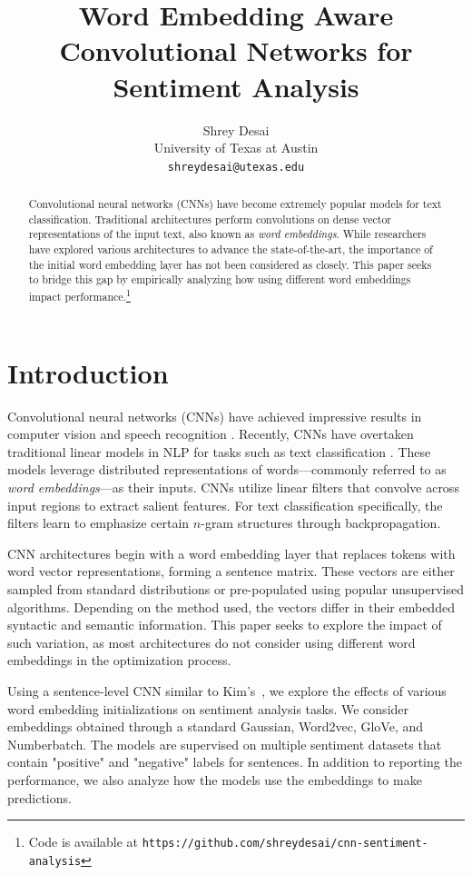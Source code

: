 \documentclass{article}
\title{Word Embedding Aware Convolutional Networks for Sentiment Analysis}
\author{%
  Shrey Desai\\
  University of Texas at Austin\\
  \texttt{shreydesai@utexas.edu} \\
}
\begin{document}
\maketitle

\begin{abstract}
  Convolutional neural networks (CNNs) have become extremely popular models for text classification. Traditional architectures perform convolutions on dense vector representations of the input text, also known as \textit{word embeddings}. While researchers have explored various architectures to advance the state-of-the-art, the importance of the initial word embedding layer has not been considered as closely. This paper seeks to bridge this gap by empirically analyzing how using different word embeddings impact performance.\footnote{Code is available at \texttt{https://github.com/shreydesai/cnn-sentiment-analysis}}
\end{abstract}

\section{Introduction}

Convolutional neural networks (CNNs) have achieved impressive results in computer vision and speech recognition \cite{cv}. Recently, CNNs have overtaken traditional linear models in NLP for tasks such as text classification \cite{cnn_language}. These models leverage distributed representations of words---commonly referred to as \textit{word embeddings}---as their inputs. CNNs utilize linear filters that convolve across input regions to extract salient features. For text classification specifically, the filters learn to emphasize certain $n$-gram structures through backpropagation.

CNN architectures begin with a word embedding layer that replaces tokens with word vector representations, forming a sentence matrix. These vectors are either sampled from standard distributions or pre-populated using popular unsupervised algorithms. Depending on the method used, the vectors differ in their embedded syntactic and semantic information. This paper seeks to explore the impact of such variation, as most architectures do not consider using different word embeddings in the optimization process.

Using a sentence-level CNN similar to Kim's~\cite{kim}, we explore the effects of various word embedding initializations on sentiment analysis tasks. We consider embeddings obtained through a standard Gaussian, Word2vec, GloVe, and Numberbatch. The models are supervised on multiple sentiment datasets that contain "positive" and "negative" labels for sentences. In addition to reporting the performance, we also analyze how the models use the embeddings to make predictions.
\end{document}
